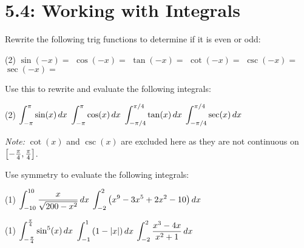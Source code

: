 \documentclass[answers]{exam}
\begin{document}
\section{5.4: Working with Integrals}


\begin{ex*}
  Rewrite the following trig functions to determine if it is even or odd:
  \begin{tasks}[label=\mbox{}](2)
    \task $\sin(-x)=$
    \task $\cos(-x)=$
    \task $\tan(-x)=$
    \task $\cot(-x)=$
    \task $\csc(-x)=$
    \task $\sec(-x)=$
  \end{tasks}
  Use this to rewrite and evaluate the following integrals:
\end{ex*}
\begin{tasks}[after-item-skip=\stretch{1}, label=\mbox{}](2)
  \task $\displaystyle\int_{-\pi}^\pi \sin(x)\,dx$
  \task $\displaystyle\int_{-\pi}^\pi \cos(x)\,dx$
  \task $\displaystyle\int_{-\pi/4}^{\pi/4} \tan(x)\,dx$
  \task $\displaystyle\int_{-\pi/4}^{\pi/4} \sec(x)\,dx$
\end{tasks}
\textit{Note:} $\cot(x)$ and $\csc(x)$ are excluded here as they are not continuous on ${\left[-\frac{\pi}{4},\frac{\pi}{4}\right]}$.

\vspace*{-\baselineskip}
\pagebreak

\begin{ex*}
  Use symmetry to evaluate the following integrals:
\end{ex*}
\begin{tasks}[after-item-skip=\stretch{1}](1)
  \task $\displaystyle\int_{-10}^{10} \frac{x}{\sqrt{200-x^2}}\,dx$
  \task $\displaystyle\int_{-2}^{2}{\left(x^9-3x^5+2x^2-10\right)}\,dx$
\end{tasks}
\pagebreak

\begin{tasks}[after-item-skip=\stretch{1}, resume](1)
  \task $\displaystyle\int_{-\frac{\pi}{4}}^{\frac{\pi}{4}}\sin^5(x)\,dx$
  \task $\displaystyle\int_{-1}^{1}{\left(1-{\left\vert x\right\vert}\right)}\,dx$
  \task $\displaystyle\int_{-2}^{2}\frac{x^3-4x}{x^2+1}\,dx$
\end{tasks}
\pagebreak
\end{document}
